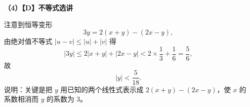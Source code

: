 \begin{answer}
\textbf{（4）【D】不等式选讲}

注意到恒等变形
\nopagebreak[4]
\[3y=2(x+y)-(2x-y),\]
由绝对值不等式 $|u-v|\leqslant|u|+|v|$ 得
\nopagebreak[4]
\[|3y|\leqslant2|x+y|+|2x-y|<2\times\frac13+\frac16=\frac56,\]
故
\nopagebreak[4]
\[|y|<\frac{5}{18}.\]
说明：关键是把 $y$ 用已知的两个线性式表示成 $2(x+y)-(2x-y)$，使 $x$ 的系数相消而 $y$ 的系数为 $3$。





\end{answer}
